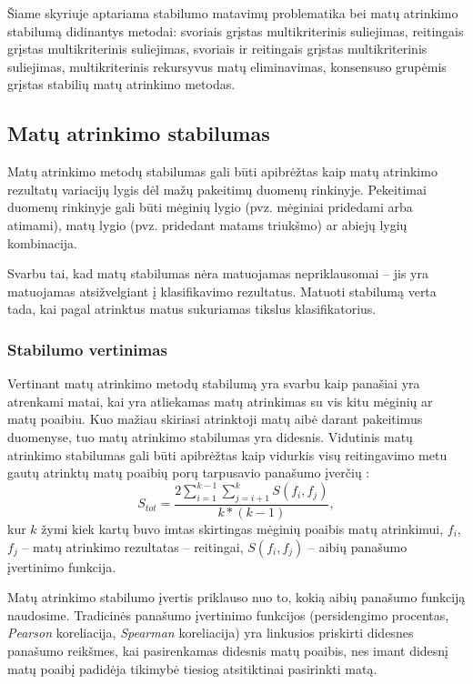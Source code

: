 Šiame skyriuje aptariama stabilumo matavimų problematika bei matų atrinkimo stabilumą didinantys metodai: svoriais grįstas multikriterinis suliejimas, reitingais grįstas multikriterinis suliejimas, svoriais ir reitingais grįstas multikriterinis suliejimas, multikriterinis rekursyvus matų eliminavimas, konsensuso grupėmis grįstas stabilių matų atrinkimo metodas.

\subsection{Matų atrinkimo stabilumas}

Matų atrinkimo metodų stabilumas gali būti apibrėžtas kaip matų atrinkimo rezultatų variacijų lygis dėl mažų pakeitimų duomenų rinkinyje. Pekeitimai duomenų rinkinyje gali būti mėginių lygio (pvz. mėginiai pridedami arba atimami), matų lygio (pvz. pridedant matams triukšmo) ar abiejų lygių kombinacija.

Svarbu tai, kad matų stabilumas nėra matuojamas nepriklausomai -- jis yra matuojamas atsižvelgiant į klasifikavimo rezultatus. Matuoti stabilumą verta tada, kai pagal atrinktus matus sukuriamas tikslus klasifikatorius.

\subsubsection{Stabilumo vertinimas}

Vertinant matų atrinkimo metodų stabilumą yra svarbu kaip panašiai yra atrenkami matai, kai yra atliekamas matų atrinkimas su vis kitu mėginių ar matų poaibiu. Kuo mažiau skiriasi atrinktoji matų aibė darant pakeitimus duomenyse, tuo matų atrinkimo stabilumas yra didesnis. Vidutinis matų atrinkimo stabilumas gali būti apibrėžtas kaip vidurkis visų reitingavimo metu gautų atrinktų matų poaibių porų tarpusavio panašumo įverčių \cite{kalousis2007stability}:
\begin{equation}
 S_{tot}=\frac{2\sum_{i=1}^{k-1}\sum_{j=i+1}^{k} S(f_i, f_j)}{k*(k-1)},
\end{equation} 
kur $k$ žymi kiek kartų buvo imtas skirtingas mėginių poaibis matų atrinkimui,
$f_i$, $f_j$ -- matų atrinkimo rezultatas -- reitingai, 
$S(f_i, f_j)$ -- aibių panašumo įvertinimo funkcija.

Matų atrinkimo stabilumo įvertis priklauso nuo to, kokią aibių panašumo funkciją naudosime. Tradicinės panašumo įvertinimo funkcijos (persidengimo procentas, \textit{Pearson} koreliacija, \textit{Spearman} koreliacija) yra linkusios priskirti didesnes panašumo reikšmes, kai pasirenkamas didesnis matų poaibis, nes imant didesnį matų poaibį padidėja tikimybė tiesiog atsitiktinai pasirinkti matą.

